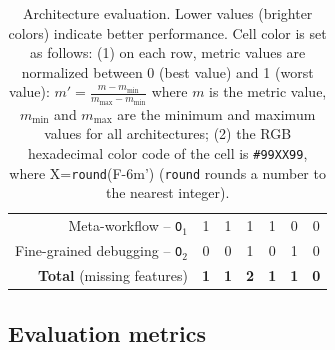 \documentclass[preprint,3p,twocolumn]{elsarticle}
\begin{document}
\begin{table}
\begin{tabular}{rcccccc}
  Meta-workflow  -- \texttt{O$_1$}    & \cellcolor[HTML]{999999}1
                                     & \cellcolor[HTML]{999999}1
                                     & \cellcolor[HTML]{999999}1
                                     & \cellcolor[HTML]{999999}1
                                     & \cellcolor[HTML]{99FF99}0
                                     & \cellcolor[HTML]{99FF99}0\\
  Fine-grained debugging -- \texttt{O$_2$}   & \cellcolor[HTML]{99FF99}0
                                     & \cellcolor[HTML]{99FF99}0
                                     & \cellcolor[HTML]{999999}1
                                     & \cellcolor[HTML]{99FF99}0
                                     & \cellcolor[HTML]{999999}1
                                     & \cellcolor[HTML]{99FF99}0\\
  \textbf{Total} (missing features) & \cellcolor[HTML]{99CC99}\textbf{1}
                                     & \cellcolor[HTML]{99CC99}\textbf{1}
                                     & \cellcolor[HTML]{999999}\textbf{2}
                                     & \cellcolor[HTML]{99CC99}\textbf{1}
                                     & \cellcolor[HTML]{99CC99}\textbf{1}
                                     & \cellcolor[HTML]{99FF99}\textbf{0}\\
\end{tabular}

\caption{Architecture evaluation. Lower values (brighter colors) indicate better performance. Cell color is set as follows: (1) on each row, metric values are
  normalized between 0 (best value) and 1 (worst value):
  $m'=\frac{m-m_{\mathrm{min}}}{m_{\mathrm{max}}-m_{\mathrm{min}}}$ where
  $m$ is the metric value, $m_{\mathrm{min}}$ and $m_{\mathrm{max}}$
  are the minimum and maximum values for all architectures; (2) the RGB hexadecimal color code of the cell
  is \texttt{\#99XX99}, where X=\texttt{round}(F-6m') (\texttt{round} rounds a number to the nearest integer). }
\label{table:evaluation}
\end{table}

\subsection{Evaluation metrics}
\end{document}
